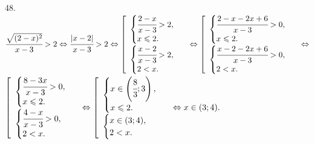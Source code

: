 \documentclass[12pt]{article}
\begin{document}
48. $\cfrac{\sqrt{(2-x)^2}}{x-3}>2\Leftrightarrow\cfrac{|x-2|}{x-3}>2\Leftrightarrow\left[\begin{array}{l} \begin{cases} \cfrac{2-x}{x-3}>2,\\
x\leqslant2.\end{cases}\\ \begin{cases} \cfrac{x-2}{x-3}>2,\\ 2<x.\end{cases}\end{array}\right.\Leftrightarrow\left[\begin{array}{l} \begin{cases} \cfrac{2-x-2x+6}{x-3}>0,\\ x\leqslant2.\end{cases}\\ \begin{cases} \cfrac{x-2-2x+6}{x-3}>0,\\ 2<x.\end{cases}\end{array}\right.\Leftrightarrow$\\$\left[\begin{array}{l} \begin{cases} \cfrac{8-3x}{x-3}>0,\\ x\leqslant2.\end{cases}\\ \begin{cases} \cfrac{4-x}{x-3}>0,\\ 2<x.\end{cases}\end{array}\right.\Leftrightarrow\left[\begin{array}{l} \begin{cases} x\in\left(\cfrac{8}{3};3\right),\\ x\leqslant2.\end{cases}\\ \begin{cases} x\in(3;4),\\ 2<x.\end{cases}\end{array}\right.\Leftrightarrow x\in (3;4).$\\
\end{document}
